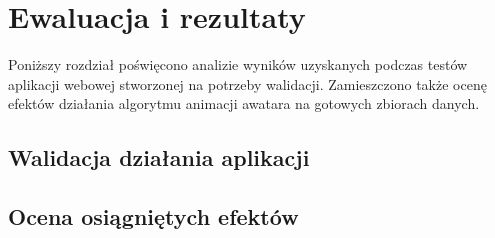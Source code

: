 \chapter{Ewaluacja i rezultaty}
\label{cha:ewaluacjaIRezultaty}
Poniższy rozdział poświęcono analizie wyników uzyskanych podczas testów aplikacji webowej stworzonej na potrzeby walidacji. Zamieszczono także ocenę efektów działania algorytmu animacji awatara na gotowych zbiorach danych.

\section{Walidacja działania aplikacji}
\section{Ocena osiągniętych efektów}

